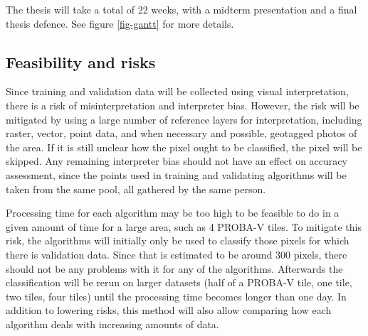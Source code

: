 \documentclass[a4paper,10pt]{article}
\begin{document}
The thesis will take a total of 22 weeks, with a midterm presentation and a final thesis defence. See figure \ref{fig-gantt} for more details.

\subsection{Feasibility and risks}

Since training and validation data will be collected using visual interpretation, there is a risk of misinterpretation and interpreter bias. However, the risk will be mitigated by using a large number of reference layers for interpretation, including raster, vector, point data, and when necessary and possible, geotagged photos of the area. If it is still unclear how the pixel ought to be classified, the pixel will be skipped. Any remaining interpreter bias should not have an effect on accuracy assessment, since the points used in training and validating algorithms will be taken from the same pool, all gathered by the same person.

Processing time for each algorithm may be too high to be feasible to do in a given amount of time for a large area, such as 4 PROBA-V tiles. To mitigate this risk, the algorithms will initially only be used to classify those pixels for which there is validation data. Since that is estimated to be around 300 pixels, there should not be any problems with it for any of the algorithms. Afterwards the classification will be rerun on larger datasets (half of a PROBA-V tile, one tile, two tiles, four tiles) until the processing time becomes longer than one day. In addition to lowering risks, this method will also allow comparing how each algorithm deals with increasing amounts of data.


\end{document}

